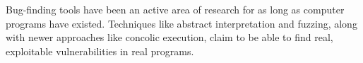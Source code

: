 

Bug-finding tools have been an active area of research for as long as computer programs have existed. Techniques like abstract interpretation and fuzzing, along with newer approaches like concolic execution, claim to be able to find real, exploitable vulnerabilities in real programs. 